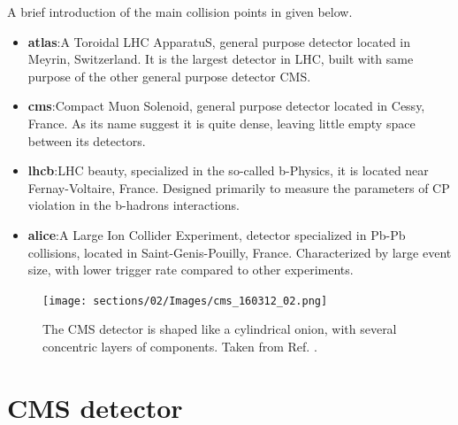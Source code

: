 \documentclass[../../main.tex]{subfiles}
\begin{document}
A brief introduction of the main collision points in given below.
\begin{itemize}
    \item \textbf{\acrshort{atlas}}:A Toroidal LHC ApparatuS, general purpose detector located in Meyrin, Switzerland. It is the largest detector in LHC, built with same purpose of the other general purpose detector CMS.
    \item \textbf{\acrshort{cms}}:Compact Muon Solenoid, general purpose detector located in Cessy, France. As its name suggest it is quite dense, leaving little empty space between its detectors.
    \item \textbf{\acrshort{lhcb}}:LHC beauty, specialized in the so-called b-Physics, it is located near Fernay-Voltaire, France. Designed primarily to measure the parameters of CP violation in the b-hadrons interactions.
    \item \textbf{\acrshort{alice}}:A Large Ion Collider Experiment, detector specialized in Pb-Pb collisions, located in Saint-Genis-Pouilly, France. Characterized by large event size, with lower trigger rate compared to other experiments.
\end{itemize}

\begin{figure}[h]
    \centering
    \texttt{[image: sections/02/Images/cms\_160312\_02.png]}
    \caption{The CMS detector is shaped like a cylindrical onion, with several concentric layers of components. Taken from Ref. \cite{CMS}.}
    \label{fig:CMS_det}
\end{figure}

\section{CMS detector}
\end{document}
